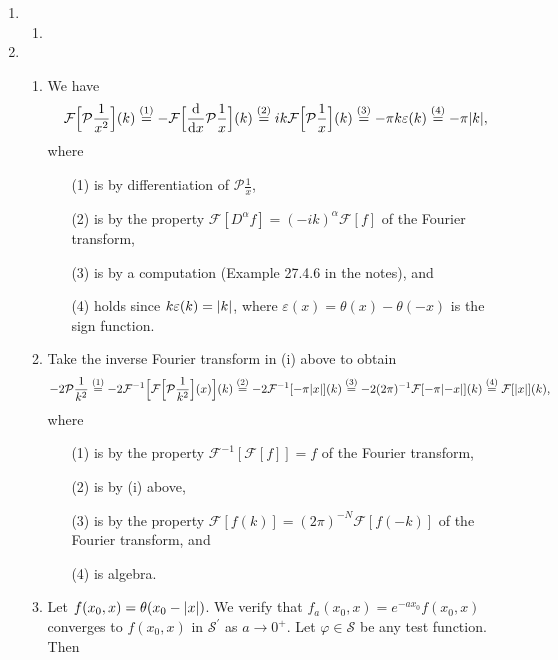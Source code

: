 \documentclass[11pt]{article}
\newcommand{\eq}[1]{\overset{(#1)}{=}}
\begin{document}
\begin{enumerate}
    \item\begin{enumerate}[label=(\roman*)]
        Let $L = D^2+2\gamma D+ \omega^2I$ for $\gamma\geq 0$ denote the differential operator for an oscillator.
        \item 
    \end{enumerate}

    \hrulefill

    \item\begin{enumerate}[label=(\roman*)]
        \item We have
        \[\mathcal F\Big[\mathcal P\frac{1}{x^2}\Big](k) \eq{1} - \mathcal F\Big[\dv{x}\mathcal P\frac{1}{x}\Big](k) \eq{2} ik\mathcal F\Big[\mathcal P \frac{1}{x}\Big](k) \eq{3} -\pi k\varepsilon(k) \eq{4} -\pi\abs{k},\] where \begin{enumerate}
            \item[(1)] is by differentiation of $\mathcal P\frac{1}{x}$, 
            \item[(2)] is by the property $\mathcal F[D^\alpha f] = (-ik)^\alpha\mathcal F[f]$ of the Fourier transform,
            \item[(3)] is by a computation (Example 27.4.6 in the notes), and
            \item[(4)] holds since $k\varepsilon(k) = \abs{k}$, where $\varepsilon(x) = \theta(x)-\theta(-x)$ is the sign function.
        \end{enumerate}
        \item Take the inverse Fourier transform in (i) above to obtain
        \[-2\mathcal P \frac{1}{k^2} \eq{1} -2\mathcal F^{-1}\Big[\mathcal F\Big[\mathcal P\frac{1}{k^2}\Big](x)\Big](k) \eq{2} -2\mathcal F^{-1}[-\pi\abs{x}](k) \eq{3} -2(2\pi)^{-1}\mathcal F[-\pi\abs{-x}](k) \eq{4} \mathcal{F}[\abs{x}](k),\] where \begin{enumerate}
            \item[(1)] is by the property $\mathcal F^{-1}[\mathcal F[f]] = f$ of the Fourier transform,
            \item[(2)] is by (i) above,
            \item[(3)] is by the property $\mathcal F[f(k)] = (2\pi)^{-N}\mathcal F[f(-k)]$ of the Fourier transform, and
            \item[(4)] is algebra.
        \end{enumerate}
        \item Let $f(x_0,x) = \theta(x_0-\abs{x})$. We verify that $f_a(x_0,x) = e^{-ax_0}f(x_0,x)$ converges to $f(x_0,x)$ in $\mathcal S^\prime$ as $a\to 0^+$. Let $\varphi\in \mathcal S$ be any test function. Then 

\end{enumerate}
\end{enumerate}
\end{document}
